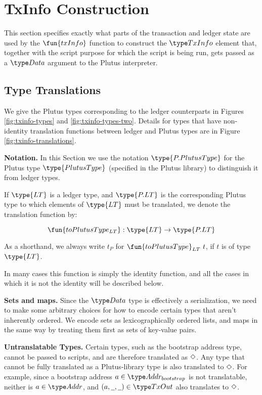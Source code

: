 \section{TxInfo Construction}
\label{sec:txinfo}

This section specifies exactly what parts of the transaction and ledger
state are used by the $\fun{txInfo}$ function to construct the
$\TxInfo$ element that, together with the script purpose for which the script
is being run, gets passed as a $\Data$ argument to the Plutus interpreter.

\subsection{Type Translations}

We give the Plutus types corresponding to the ledger counterparts in Figures \ref{fig:txinfo-types}
and \ref{fig:txinfo-types-two}. Details for types that have non-identity translation
functions between ledger and Plutus types are in Figure \ref{fig:txinfo-translations}.

\textbf{Notation.}
In this Section we use the notation $\type{P.PlutusType}$ for the Plutus type
$\type{PlutusType}$ (specified in the Plutus library) to distinguish it from ledger types.

If $\type{LT}$ is a ledger type, and $\type{P.LT}$ is the corresponding Plutus type to
which elements of $\type{LT}$ must be translated, we denote the
translation function by:

\[ \fun{toPlutusType_{LT}} : \type{LT} \to \type{P.LT} \]

As a shorthand, we always write $t_P$ for $\fun{toPlutusType}_{LT}~t$, if $t$ is of type $\type{LT}$.

In many cases this function is simply the identity function, and all
the cases in which it is not the identity will be described below.

\textbf{Sets and maps.}
Since the $\Data$ type is effectively a serialization, we need to make some arbitrary choices
for how to encode certain types that aren't inherently ordered. We encode sets as
lexicographically ordered lists, and maps in the same way by treating them first as
sets of key-value pairs.

\textbf{Untranslatable Types.}
Certain types, such as the bootstrap address type, cannot be passed to scripts, and
are therefore translated as $\Diamond$. Any type that cannot be fully translated
as a Plutus-library type is also translated to $\Diamond$.
For example, since a bootstrap address $a \in \AddrBS$
is not translatable, neither is $a\in\Addr$, and $(a,\wcard,\wcard) \in \TxOut$
also translates to $\Diamond$.

